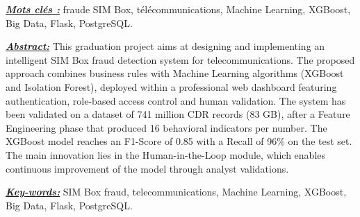 \documentclass[12pt, oneside, a4paper]{report}
\begin{document}
\vspace{0.5cm}

\noindent \underline{\textit{\textbf{\color{blue}Mots clés :}}} fraude SIM Box, télécommunications, Machine Learning, XGBoost, Big Data, Flask, PostgreSQL.

\vspace{0.5cm}

\noindent \underline{\textit{\textbf{\color{blue}Abstract:}}} This graduation project aims at designing and implementing an intelligent SIM Box fraud detection system for telecommunications. The proposed approach combines business rules with Machine Learning algorithms (XGBoost and Isolation Forest), deployed within a professional web dashboard featuring authentication, role-based access control and human validation. The system has been validated on a dataset of 741 million CDR records (83 GB), after a Feature Engineering phase that produced 16 behavioral indicators per number. The XGBoost model reaches an F1-Score of 0.85 with a Recall of 96\% on the test set. The main innovation lies in the Human-in-the-Loop module, which enables continuous improvement of the model through analyst validations.

\vspace{0.5cm}

\noindent \underline{\textit{\textbf{\color{blue}Key-words:}}} SIM Box fraud, telecommunications, Machine Learning, XGBoost, Big Data, Flask, PostgreSQL.

\restoregeometry
\let\clearpage\relax
\end{document}
